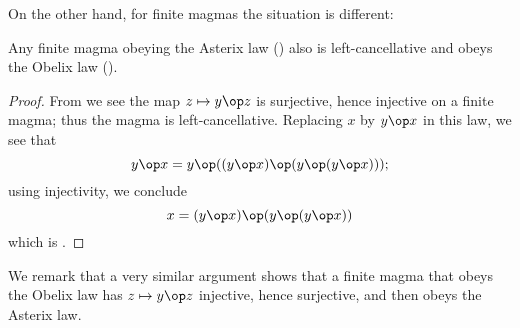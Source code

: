 On the other hand, for finite magmas the situation is different:

\begin{proposition}\label{asterix-obelix-finite}  Any finite magma obeying the Asterix law () also is left-cancellative and obeys the Obelix law ().
\end{proposition}

\begin{proof}  From  we see the map $z \mapsto y \op z$ is surjective, hence injective on a finite magma; thus the magma is left-cancellative.  Replacing $x$ by $y \op x$ in this law, we see that
$$ y \op x = y \op ((y\op x) \op (y \op (y \op x)));$$
using injectivity, we conclude
$$ x = (y\op x) \op (y \op (y \op x))$$
which is .
\end{proof}

We remark that a very similar argument shows that a finite magma that obeys the Obelix law has $z \mapsto y \op z$ injective, hence surjective, and then obeys the Asterix law.

